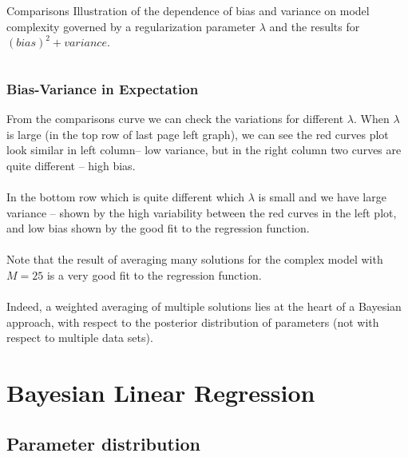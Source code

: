 \documentclass{beamer}
\begin{document}
\begin{frame}
\begin{columns}[T]
\begin{column}{.47\textwidth}
\begin{block}{Comparisons}
Illustration of the dependence of bias and variance on model complexity governed by a regularization parameter $\lambda$ and the results for $(bias)^2+variance$.

\end{block}
\end{column}
\end{columns}
\end{frame}


\begin{frame}
\frametitle{Bias-Variance in Expectation }
From the comparisons curve we can check the variations for different $\lambda$. When $\lambda$ is large (in the top row of last page left graph), we can see the red curves plot look similar in left column-- low variance,  but in the right column two curves are quite different -- high bias.\\~\\

In the bottom row which is quite different which $\lambda$ is small and we have large variance --  shown by the high variability between the red curves in the left plot, and low bias shown by the good fit to the regression function.\\~\\

Note that the result of averaging many solutions for the complex model with $M=25$ is a very good fit to the regression function.\\~\\

Indeed, a weighted averaging of multiple solutions lies at the heart of a Bayesian approach, with respect to the posterior distribution of parameters (not with respect to multiple data sets).
\end{frame}



\section{Bayesian Linear Regression} %


\subsection{Parameter distribution}
\end{document}
